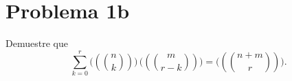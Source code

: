 
\section*{Problema 1b}
Demuestre que
\[
  \sum_{k=0}^{r} \bigl((n\choose k)\bigr)\,\bigl((m\choose r-k)\bigr) = \bigl((n+m\choose r)\bigr).
\]

